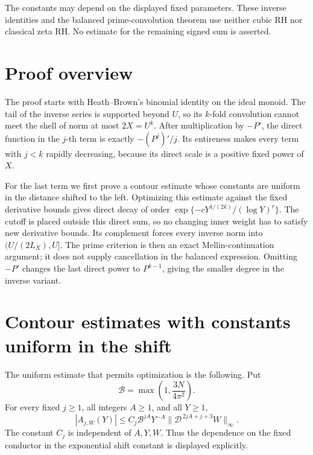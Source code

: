 The constants may depend on the displayed fixed parameters.
These inverse identities and the balanced prime-convolution theorem
use neither cubic RH nor classical zeta RH.  No estimate for the
remaining signed sum is asserted.

\section{Proof overview}
The proof starts with Heath--Brown's binomial identity on the ideal
monoid.  The tail of the inverse series is supported beyond \(U\),
so its \(k\)-fold convolution cannot meet the shell of norm at most
\(2X=U^k\).  After multiplication by \(-P'\), the direct function
in the \(j\)-th term is exactly \(-(P^j)'/j\).  Its entireness
makes every term with \(j<k\) rapidly decreasing, because its
direct scale is a positive fixed power of \(X\).

For the last term we first prove a contour estimate whose constants
are uniform in the distance shifted to the left.  Optimizing this
estimate against the fixed derivative bounds gives direct decay of
order \(\exp\{-cY^{1/(2k)}/(\log Y)^r\}\).  The cutoff is placed
outside this direct sum, so no changing inner weight has to satisfy
new derivative bounds.  Its complement forces every inverse norm
into \((U/(2L_X),U]\).  The prime criterion is then an exact
Mellin-continuation argument; it does not supply cancellation in the
balanced expression.  Omitting \(-P'\) changes the last direct
power to \(P^{k-1}\), giving the smaller degree in the inverse
variant.

\section{Contour estimates with constants uniform in the shift}

The uniform estimate that permits optimization is the following.
Put
\[
 \mathcal B=\max\left(1,\frac{3N}{4\pi^2}\right).
\]
For every fixed \(j\ge1\), all integers \(A\ge1\), and all \(Y\ge1\),
\begin{equation}
 |A_{j,W}(Y)|
 \le C_j\mathcal B^{jA}Y^{-A}
       \|\mathcal D^{\,2jA+j+3}W\|_\infty.
 \label{bfk:uniform}
\end{equation}
The constant \(C_j\) is independent of \(A,Y,W\).
Thus the dependence on the fixed conductor in the exponential
shift constant is displayed explicitly.


